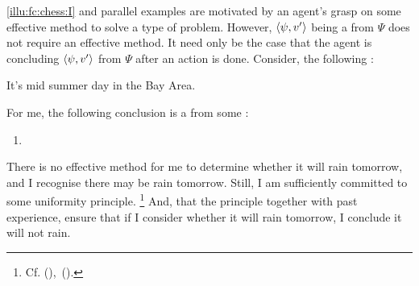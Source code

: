 \begin{note}
  \autoref{illu:fc:chess:I} and parallel examples are motivated by an agent's grasp on some effective method to solve a type of problem.
  However, \(\langle \psi, v' \rangle\) being a \fc{} from \(\Psi\) does not require an effective method.
  It need only be the case that the agent is concluding \(\langle \psi, v' \rangle\) from \(\Psi\) after an action is done.
  Consider, the following :

  \begin{scenario}%
    \label{illu:fc:sunny}%
    It's mid summer day in the Bay Area.
  \end{scenario}

  \noindent For me, the following conclusion is a \fc{} from some \pool{}:

  \begin{enumerate}[label=C\thescenarioCounter., ref=(C\thescenarioCounter)]
  \item
    \label{illu:fc:sunny:c}
  \end{enumerate}

  \noindent%
  There is no effective method for me to determine whether it will rain tomorrow, and I recognise there may be rain tomorrow.
  Still, I am sufficiently committed to some uniformity principle.%
  \footnote{
    Cf. (\cite[70]{Hempel:1965aa}),~(\cite{Henderson:2022aa}).
  }
  And, that the principle together with past experience, ensure that if I consider whether it will rain tomorrow, I conclude it will not rain.%
\end{note}

